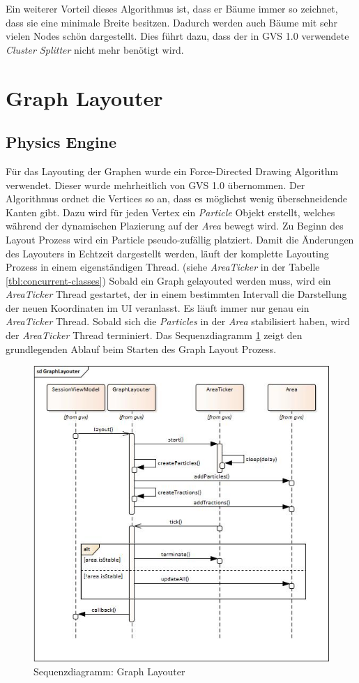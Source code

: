 \documentclass[11pt,a4paper,english,oneside]{book}
\numberwithin{equation}{chapter}
\begin{document}
	\noindent
	Ein weiterer Vorteil dieses Algorithmus ist, dass er Bäume immer so zeichnet, dass sie eine minimale Breite besitzen. Dadurch werden auch Bäume mit sehr vielen Nodes schön dargestellt. Dies führt dazu, dass der in GVS 1.0 \cite{gvs1} verwendete \textit{Cluster Splitter} nicht mehr benötigt wird. 
	
	
	
	\section{Graph Layouter}
	
	\subsection{Physics Engine} \label{ssec:graphlayouter}
	Für das Layouting der Graphen wurde ein Force-Directed Drawing Algorithm verwendet. Dieser wurde mehrheitlich von GVS 1.0 übernommen. Der Algorithmus ordnet die Vertices so an, dass es möglichst wenig überschneidende Kanten gibt. Dazu wird für jeden Vertex ein \textit{Particle} Objekt erstellt, welches während der dynamischen Plazierung auf der \textit{Area} bewegt wird. Zu Beginn des Layout Prozess wird ein Particle pseudo-zufällig platziert. Damit die Änderungen des Layouters in Echtzeit dargestellt werden, läuft der komplette Layouting Prozess in einem eigenständigen Thread. (siehe \textit{AreaTicker} in der Tabelle \ref{tbl:concurrent-classes}) Sobald ein Graph gelayouted werden muss, wird ein \textit{AreaTicker} Thread gestartet, der in einem bestimmten Intervall die Darstellung der neuen Koordinaten im UI veranlasst. Es läuft immer nur genau ein \textit{AreaTicker} Thread. Sobald sich die \textit{Particles} in der \textit{Area} stabilisiert haben, wird der \textit{AreaTicker} Thread terminiert. Das Sequenzdiagramm \ref{fig:sequencegraphlayouter} zeigt den grundlegenden Ablauf beim Starten des Graph Layout Prozess.
	
	\begin{figure}[h!]
		\centering
		\includegraphics[width=0.6\linewidth]{assets/images/sequence_graph_layouter}
		\caption{Sequenzdiagramm: Graph Layouter}
		\label{fig:sequencegraphlayouter}
	\end{figure}
	
\end{document}

